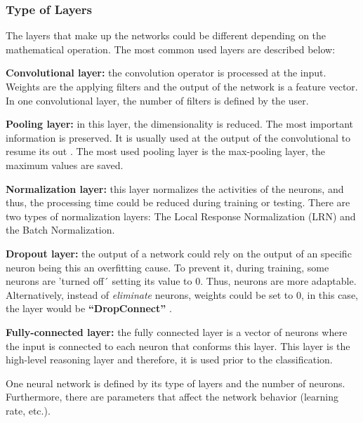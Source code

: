 \subsubsection{Type of Layers}
The layers that make up the networks could be different depending on the mathematical operation. The most common used layers are described below:
\begin{description}[itemsep=2pt,topsep=8pt,parsep=0pt,partopsep=20pt]
	\item \textbf{Convolutional layer:} the convolution operator is processed at the input. Weights are the applying filters and the output of the network is a feature vector. In one convolutional layer, the number of filters is defined by the user.
	\item \textbf{Pooling layer:} in this layer, the dimensionality is reduced. The most important information is preserved. It is usually used at the output of the convolutional to resume its out \cite{Doorn}. The most used pooling layer is the max-pooling layer, the maximum values are saved.
	\item \textbf{Normalization layer:} this layer normalizes the activities of the neurons, and thus, the processing time could be reduced during training or testing. There are two types of normalization layers: The Local Response Normalization (LRN) and the Batch Normalization.
	\item \textbf{Dropout layer:} the output of a network could rely on the output of an specific neuron being this an overfitting cause. To prevent it, during training, some neurons are 'turned off´ setting its value to 0. Thus, neurons are more adaptable. Alternatively, instead of \textit{eliminate} neurons,  weights could be set to 0, in this case, the layer would be \textbf{``DropConnect''} \cite{Doorn}.
\item  \textbf{Fully-connected layer:} the fully connected layer is a vector of neurons where the input is connected to each neuron that conforms this layer. This layer is the high-level reasoning layer and therefore, it is used prior to the classification.
\end{description}

One neural network is defined by its type of layers and the number of neurons. Furthermore, there are parameters that affect the network behavior (learning rate, etc.)\cite{Lecum2}.

